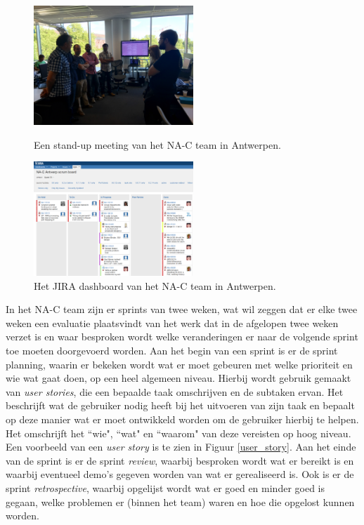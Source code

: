 \documentclass[10pt,a4paper]{article}
\begin{document}
\begin{figure}
\centering
\begin{minipage}{0.45\textwidth}
\centering
\includegraphics[width=60mm]{standupmeeting.jpg}
\caption{Een stand-up meeting van het NA-C team in Antwerpen.}
\label{standup}
\end{minipage}\hfill
\begin{minipage}{0.45\textwidth}
\centering
\includegraphics[width=60mm]{CaptureJira.png}
\caption{Het JIRA dashboard van het NA-C team in Antwerpen.}
\label{jira}
\end{minipage}
\end{figure}


In het NA-C team zijn er sprints van twee weken, wat wil zeggen dat er elke twee weken een evaluatie plaatsvindt van het werk dat in de afgelopen twee weken verzet is en waar besproken wordt welke veranderingen er naar de volgende sprint toe moeten doorgevoerd worden. Aan het begin van een sprint is er de sprint planning, waarin er bekeken wordt wat er moet gebeuren met welke prioriteit en wie wat gaat doen, op een heel algemeen niveau. Hierbij wordt gebruik gemaakt van \textit{user stories}, die een bepaalde taak omschrijven en de subtaken ervan. Het beschrijft wat de gebruiker nodig heeft bij het uitvoeren van zijn taak en bepaalt op deze manier wat er moet ontwikkeld worden om de gebruiker hierbij te helpen. Het omschrijft het ``wie", ``wat" en ``waarom" van deze vereisten op hoog niveau. Een voorbeeld van een \textit{user story} is te zien in Figuur \ref{user_story}. Aan het einde van de sprint is er de sprint \textit{review}, waarbij besproken wordt wat er bereikt is en waarbij eventueel demo's gegeven worden van wat er gerealiseerd is. Ook is er de sprint \textit{retrospective}, waarbij opgelijst wordt wat er goed en minder goed is gegaan, welke problemen er (binnen het team) waren en hoe die opgelost kunnen worden.
\end{document}
